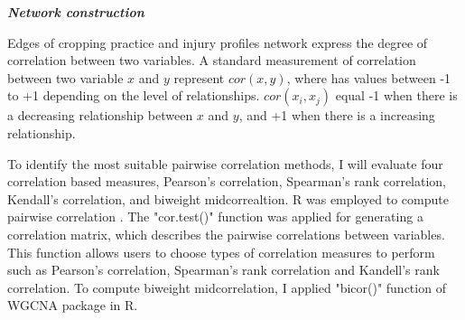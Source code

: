 


\textit{\textbf{Network construction}}



Edges of cropping practice and injury profiles network express the degree of correlation between two variables. A standard measurement of correlation between two variable $x$ and $y$ represent $cor(x,y)$, where has values between -1 to +1 depending on the level of relationships. $cor(x_{i}, x_{j})$ equal -1 when there is a decreasing relationship between $x$ and $y$, and +1 when there is a increasing relationship.

To identify the most suitable pairwise correlation methods, I will evaluate four correlation based measures, Pearson's correlation, Spearman's rank correlation, Kendall's correlation, and biweight midcorrealtion. R was employed to compute pairwise correlation . The "cor.test()" function was applied for generating a correlation matrix, which describes the pairwise correlations between variables. This function allows users to choose types of correlation measures to perform such as Pearson's correlation, Spearman's rank correlation and Kandell's rank correlation. To compute biweight midcorrelation, I applied "bicor()" function of WGCNA package  in R. 

